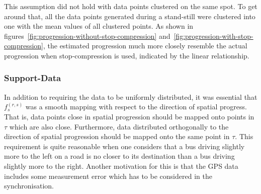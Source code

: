 \noindent
This assumption did not hold with data points clustered on the same
spot. To get around that, all the data points generated during a stand-still were clustered into one with the mean values of all clustered points. As shown in figures~\ref{fig:progression-without-stop-compression} and~\ref{fig:progression-with-stop-compression}, the estimated progression much more closely resemble the actual progression when stop-compression is used, indicated by the linear relationship.

\subsubsection{Support-Data}
\label{sec:support-data}
In addition to requiring the data to be uniformly distributed, it was essential that $f^{(r,s)}_s$ was a smooth mapping with respect to the direction of spatial progress. That is, data points close in spatial progression should be mapped onto points in $\tau$ which are also close. Furthermore, data distributed orthogonally to the direction of spatial progression should be mapped onto the same point in $\tau$. This requirement is quite reasonable when one considers that a bus driving slightly more to the left on a road is no closer to its destination than a bus driving slightly more to the right. Another motivation for this is that the GPS data includes some measurement error which has to be considered in the synchronisation.

